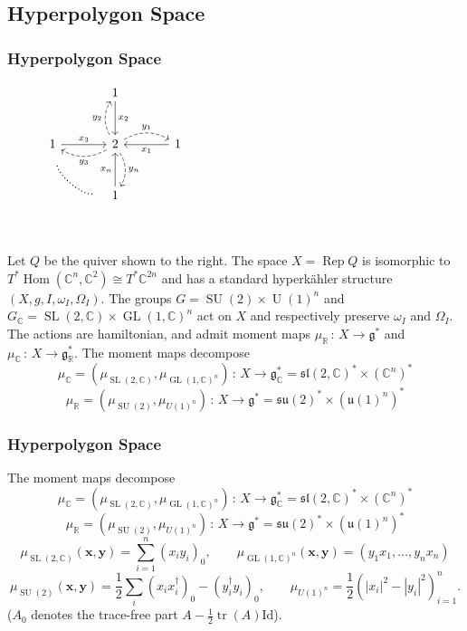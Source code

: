 \documentclass[aspectratio=1610,10pt]{beamer}
\theoremstyle{definition}
\theoremstyle{named}
\newcommand{\R}{\mathbb{R}}
\newcommand{\C}{\mathbb{C}}
\newcommand{\from}{\,:\,}
\DeclareMathOperator{\tr}{tr}
\DeclareMathOperator{\GL}{GL}
\DeclareMathOperator{\SL}{SL}
\DeclareMathOperator{\U}{U}
\DeclareMathOperator{\SU}{SU}
\DeclareMathOperator{\Hom}{Hom}
\DeclareMathOperator{\Rep}{Rep}
\newcommand{\bx}{\mathbf{x}}
\newcommand{\by}{\mathbf{y}}
\begin{document}
\subsection{Hyperpolygon Space}
\begin{frame}[fragile]
    \frametitle{Hyperpolygon Space}
    \begin{figure}
    \vspace{-57pt}
    $
    \begin{tikzcd}[sep=large]
                    &1\arrow{d}{x_2}
                            &\\
        1\arrow{r}{x_3}  &2\arrow["y_1", r, dashed, bend left]\arrow["y_2", u, dashed, bend left]\arrow["y_3", l, dashed, bend left]\arrow["y_n", d, dashed, bend left]
                            &1\arrow{l}{x_1} \\
                    &1\arrow{u}{x_n}\arrow[lu, no head, thick, dotted, shorten <=3ex, shorten >=3ex, bend left=45, xshift=.4ex, yshift=.8ex]     &           \\
    \end{tikzcd}
    $
    \vspace{-80pt}
    \end{figure}
    Let $Q$ be the quiver shown to the right.  The space $X=\Rep Q$ is isomorphic to $T^*\Hom(\C^n,\C^2)\cong T^*\C^{2n}$ and has a standard hyperkähler structure $(X,g,I,\omega_I,\Omega_I)$.
    \vfill
    \pause
    The groups $G=\SU(2)\times\U(1)^n$ and $G_\C=\SL(2,\C)\times\GL(1,\C)^n$ act on $X$ and respectively preserve $\omega_I$ and $\Omega_I$.  The actions are hamiltonian, and admit moment maps $\mu_\R\from X\to\mathfrak g^*$ and $\mu_\C\from X\to\mathfrak g_\R^*$.
    \vfill
    \pause
    The moment maps decompose
        $$\mu_\C=\left(\mu_{\SL(2,\C)},\mu_{\GL(1,\C)^n}\right)\from X\to\mathfrak g_\C^*=\mathfrak{sl}(2,\C)^*\times(\C^n)^*$$
        $$\mu_\R=(\mu_{\SU(2)},\mu_{U(1)^n})\from X\to\mathfrak g^*=\mathfrak{su}(2)^*\times(\mathfrak u(1)^n)^*$$
    \vfill
\end{frame}

\begin{frame}
    \frametitle{Hyperpolygon Space}
    The moment maps decompose
        $$\mu_\C=\left(\mu_{\SL(2,\C)},\mu_{\GL(1,\C)^n}\right)\from X\to\mathfrak g_\C^*=\mathfrak{sl}(2,\C)^*\times(\C^n)^*$$
        $$\mu_\R=(\mu_{\SU(2)},\mu_{U(1)^n})\from X\to\mathfrak g^*=\mathfrak{su}(2)^*\times(\mathfrak u(1)^n)^*$$
    \vfill
    \begin{equation*}
        \mu_{\SL(2,\C)}(\bx,\by)=\sum_{i=1}^n (x_iy_i)_0,\qquad
            \mu_{\GL(1,\C)^n}(\bx,\by)=(y_1x_1,\dots,y_nx_n)
    \end{equation*}
    \begin{equation*}
        \mu_{\SU(2)}(\bx,\by)=\frac 12\sum_i (x_ix_i^\dagger)_0-(y_i^\dagger y_i)_0,\qquad
            \mu_{U(1)^n}=\frac 12\left(|x_i|^2-|y_i|^2\right)_{i=1}^n.
    \end{equation*}
    \vfill
    ($A_0$ denotes the trace-free part $A-\frac12\tr(A)\text{Id}$).
    \vfill

\end{frame}
\end{document}
